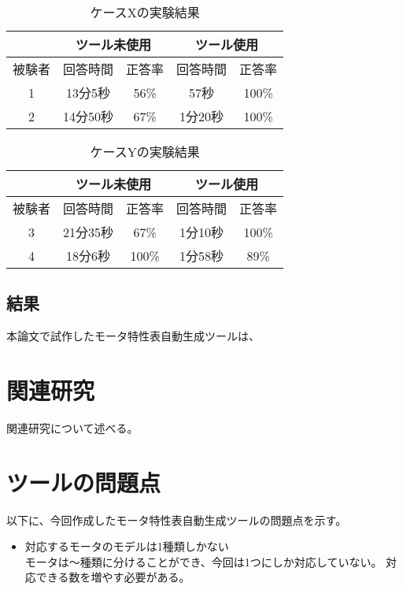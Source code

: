 \begin{table}[tp]
  \begin{center}
    \caption{ケースXの実験結果}
    \label{resultX}
    \begin{tabular}{c|c|c|c|c|}
    \cline{2-5}
                              & \multicolumn{2}{c|}{ツール未使用} & \multicolumn{2}{c|}{ツール使用} \\ \hline
    \multicolumn{1}{|c||}{被験者} & 回答時間           & 正答率          & 回答時間           & 正答率         \\ \hline\hline
    \multicolumn{1}{|c||}{1}   & 13分5秒           & 56\%         & 57秒           & 100\%         \\ \hline
    \multicolumn{1}{|c||}{2}   & 14分50秒          & 67\%          & 1分20秒          & 100\%         \\ \hline
    \end{tabular}
  \end{center}
\end{table}

\begin{table}[tp]
  \begin{center}
    \caption{ケースYの実験結果}
    \label{resultY}
    \begin{tabular}{c|c|c|c|c|}
    \cline{2-5}
                              & \multicolumn{2}{c|}{ツール未使用} & \multicolumn{2}{c|}{ツール使用} \\ \hline
    \multicolumn{1}{|c||}{被験者} & 回答時間           & 正答率          & 回答時間           & 正答率         \\ \hline\hline
    \multicolumn{1}{|c||}{3}   & 21分35秒           & 67\%         & 1分10秒           & 100\%         \\ \hline
    \multicolumn{1}{|c||}{4}   & 18分6秒          & 100\%          & 1分58秒          & 89\%         \\ \hline
    \end{tabular}
  \end{center}
\end{table}


\subsection{結果}
本論文で試作したモータ特性表自動生成ツールは、

\section{関連研究}

	関連研究について述べる。

\section{ツールの問題点}

以下に、今回作成したモータ特性表自動生成ツールの問題点を示す。

\begin{itemize}
	\item 対応するモータのモデルは1種類しかない\\
		  モータは～種類に分けることができ、今回は1つにしか対応していない。
		  対応できる数を増やす必要がある。
		
\end{itemize}







